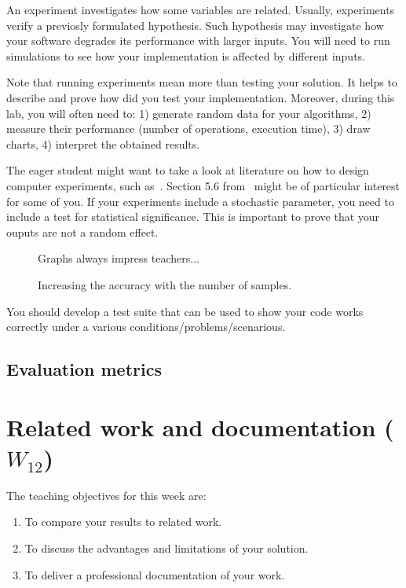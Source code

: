 \documentclass[a4paper,12pt]{report}
\begin{document}
An experiment investigates how some variables are related. 
Usually, experiments verify a previosly formulated hypothesis.
Such hypothesis may investigate how your software degrades its performance with larger inputs.
You will need to run simulations to see how your implementation is affected by different inputs.


Note that running experiments mean more than testing your solution. 
It helps to describe and prove how did you test your implementation.
Moreover, during this lab, you will often need to: 
1) generate random data for your algorithms,
2) measure their performance (number of operations, execution time),
3) draw charts,
4) interpret the obtained results.

The eager student might want to take a look at literature on how to design computer experiments, such as~\cite{fang2005design}. Section 5.6 from~\cite{fang2005design} might be of particular interest for some of you. 
If your experiments include a stochastic parameter, you need to include a test for statistical significance. 
This is important to prove that your ouputs are not a random effect.



\begin{figure}
Graphs always impress teachers...
\caption{Increasing the accuracy with the number of samples.}
\label{fig:accuracy}
\end{figure}

You should develop a test suite that can be used to show your code works correctly under a various conditions/problems/scenarious.


\section{Evaluation metrics}



\chapter{Related work and documentation ($W_{12}$)}

The teaching objectives for this week are:
\begin{enumerate}
 \item To compare your results to related work.
\item To discuss the advantages and limitations of your solution.
\item To deliver a professional documentation of your work.
\end{enumerate}
\end{document}
